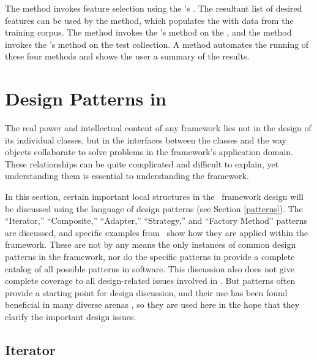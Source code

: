 \begin{description}
The  method invokes feature selection using the
's .  The resultant list of
desired features can be used by the 
method, which populates the  with data from the
training corpus.  The  method invokes the
's  method on the ,
and the  method invokes the
's  method on the test
collection.  A  method automates the running
of these four methods and shows the user a summary of the results.

\end{description}

\section{Design Patterns in \aicat}

The real power and intellectual content of any framework lies not in
the design of its individual classes, but in the interfaces between
the classes and the way objects collaborate to solve problems in the
framework's application domain. \cite[p. 31]{fayad:99} These
relationships can be quite complicated and difficult to explain, yet
understanding them is essential to understanding the framework.

In this section, certain important local structures in the \aicat\
framework design will be discussed using the language of design
patterns (see Section \ref{patterns}).  The ``Iterator,'' ``Composite,'' ``Adapter,'' ``Strategy,''
and ``Factory Method'' patterns are discussed, and specific examples
from \aicat\ show how they are applied within the framework.  These
are not by any means the only instances of common design patterns in
the framework, nor do the specific patterns in \cite{gamma:95} provide
a complete catalog of all possible patterns in software.  This
discussion also does not give complete coverage to all design-related
issues involved in \aicat.  But patterns often provide a starting
point for design discussion, and their use has been found beneficial
in many diverse arenas \cite{granlund:99}, so they are used here in
the hope that they clarify the important design issues.

\subsection{Iterator}

